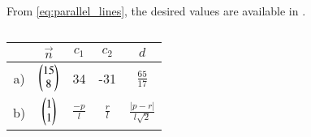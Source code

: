 	From \eqref{eq:parallel_lines}, the desired values are available in
  .
\begin{table}[!htbp]
  \centering
  \begin{tabular}{|c|c|c|c|c|}
    \hline
    & $\vec{n}$ & $c_1$ & $c_2$ & $d$ \\
    \hline
    a) & $\begin{pmatrix}15 \\ 8\end{pmatrix}$ & 34 & -31 & $\frac{65}{17}$ \\
    \hline
    b) & $\begin{pmatrix}1 \\ 1\end{pmatrix}$ & $\frac{-p}{l}$ & $\frac{r}{l}$ & $\frac{\lvert p-r \rvert}{l\sqrt{2}}$ \\
    \hline
  \end{tabular}
  \caption{}
  \label{tab:11/10/3/6}
\end{table}
